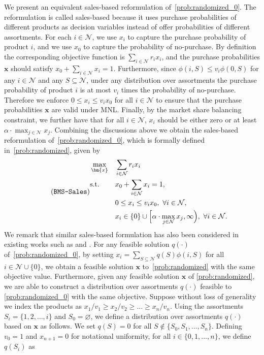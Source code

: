 \documentclass[mnsc,non-blindrev]{informs3}
\theoremstyle{definition}
\begin{document}
We present an equivalent sales-based reformulation of~\ref{prob:randomized_0}. The reformulation is called sales-based because it uses purchase probabilities of different products as decision variables instead of offer probabilities of different assortments. For each $i\in\mathcal{N}$, we use $x_i$ to capture the purchase probability of product $i$, and we use $x_0$ to capture the probability of no-purchase. By definition the corresponding objective function is $\sum_{i\in\mathcal{N}}r_ix_i$, and the purchase probabilities $\bm{x}$ should satisfy $x_0+\sum_{i\in\mathcal{N}}x_i=1$. Furthermore, since $\phi(i,S)\leq v_i\phi(0,S)$ for any $i\in\mathcal{N}$ and any $S\subseteq\mathcal{N}$, under any distribution over assortments the purchase probability of product $i$ is at most $v_i$ times the probability of no-purchase. Therefore we enforce $0\leq x_i\leq v_ix_0$ for all $i\in\mathcal{N}$ to ensure that the purchase probabilities $\bm{x}$ are valid under MNL. Finally, by the market share balancing constraint, we further have that for all $i\in\mathcal{N}$, $x_i$ should be either zero or at least $\alpha\cdot\max_{j\in\mathcal{N}}x_j$. Combining the discussions above we obtain the sales-based reformulation of~\ref{prob:randomized_0}, which is formally defined in~\ref{prob:randomized}, given by
\begin{equation}\label{prob:randomized}
\tag{\texttt{BMS-Sales}}
\begin{aligned}
&\max_{\bm{x}} && \sum_{i\in\mathcal{N}}r_ix_i\\
&\textup{s.t.} && x_0+\sum_{i\in\mathcal{N}}x_i=1,\\
&&&0\leq x_i\leq v_ix_0,\ \forall i\in\mathcal{N},\\
&&&x_i\in\{0\}\cup\Big[\alpha\cdot\max_{j\in\mathcal{N}}x_j,\infty\Big),\ \forall i\in\mathcal{N}.
\end{aligned}
\end{equation}
{  We remark that similar sales-based formulation has also been considered in existing works such as \cite{topaloglu2013joint} and \cite{gallego2015general}.} For any feasible solution $q(\cdot)$ of~\ref{prob:randomized_0}, by setting $x_i=\sum_{S\subseteq\mathcal{N}}q(S)\phi(i,S)$ for all $i\in\mathcal{N}\cup\{0\}$, we obtain a feasible solution $\bm{x}$ to~\ref{prob:randomized} with the same objective value. Furthermore, given any feasible solution $\bm{x}$ of \ref{prob:randomized}, we are able to construct a distribution over assortments $q(\cdot)$ feasible to \ref{prob:randomized_0} with the same objective. Suppose without loss of generality we index the products as $x_1/v_1\geq x_2/v_2\geq\dots\geq x_n/v_n$. Using the assortments $S_i=\{1,2,\dots,i\}$ and $S_0=\varnothing$, we define a distribution over assortments $q(\cdot)$ based on $\bm{x}$ as follows. We set $q(S)=0$ for all $S\notin\{S_0,S_1,\dots,S_n\}$. Defining $v_0=1$ and $x_{n+1}=0$ for notational uniformity, for all $i\in\{0,1,\dots,n\}$, we define $q(S_i)$ as
\end{document}
